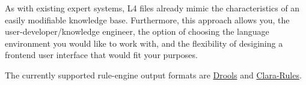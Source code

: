 As with existing expert systems, L4 files already mimic the characteristics 
of an easily modifiable knowledge base. 
Furthermore, this approach allows you, the user-developer/knowledge engineer, 
the option of choosing the language environment you would like to work with, and the 
flexibility of desigining a frontend user interface that would fit your purposes.

The currently supported rule-engine output formats are 
\href{https://docs.jboss.org/drools/release/7.58.0.Final/drools-docs/html_single/}{Drools} 
and 
\href{http://www.clara-rules.org/}{Clara-Rules}.



